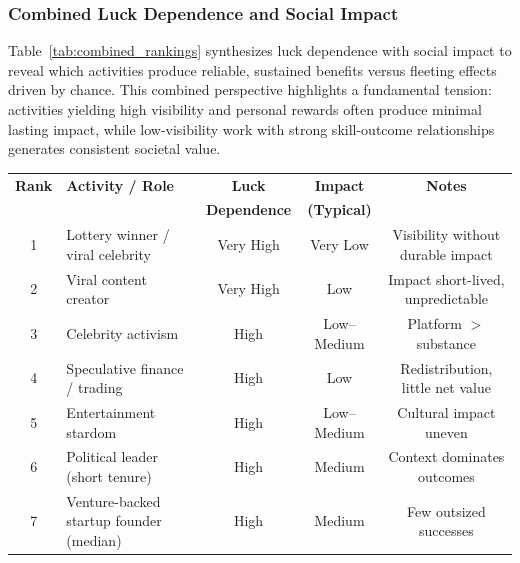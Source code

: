 \subsubsection{Combined Luck Dependence and Social Impact}

Table~\ref{tab:combined_rankings} synthesizes luck dependence with
social impact to reveal which activities produce reliable, sustained benefits
versus fleeting effects driven by chance. This combined perspective
highlights a fundamental tension: activities yielding high visibility and
personal rewards often produce minimal lasting impact, while low-visibility
work with strong skill-outcome relationships generates consistent
societal value.

\begin{table}[H]
  \centering
  \small
  \begin{tabular}{clccc}
    \toprule \textbf{Rank} & \textbf{Activity / Role}                & \textbf{Luck}       & \textbf{Impact}    & \textbf{Notes}                    \\
                           &                                         & \textbf{Dependence} & \textbf{(Typical)} &                                   \\
    \midrule 1             & Lottery winner / viral celebrity        & Very High           & Very Low           & Visibility without durable impact \\
    2                      & Viral content creator                   & Very High           & Low                & Impact short-lived, unpredictable \\
    3                      & Celebrity activism                      & High                & Low--Medium        & Platform $>$ substance            \\
    4                      & Speculative finance / trading           & High                & Low                & Redistribution, little net value  \\
    5                      & Entertainment stardom                   & High                & Low--Medium        & Cultural impact uneven            \\
    6                      & Political leader (short tenure)         & High                & Medium             & Context dominates outcomes        \\
    7                      & Venture-backed startup founder (median) & High                & Medium             & Few outsized successes            \\

\end{tabular}
\end{table}
